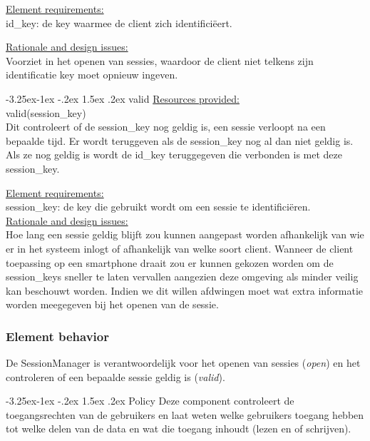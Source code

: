 \documentclass[a4paper,10pt]{book}
\makeatletter
\renewcommand\paragraph{\@startsection{paragraph}{4}{\z@}%
  {-3.25ex\@plus -1ex \@minus -.2ex}%
  {1.5ex \@plus .2ex}%
  {\normalfont\normalsize\bfseries}}
\makeatother
\begin{document}
\underline{Element requirements:}\\
id\_key: de key waarmee de client zich identifici\"{e}ert.

\underline{Rationale and design issues:}\\
Voorziet in het openen van sessies, waardoor de client niet telkens zijn identificatie key moet opnieuw ingeven.

\paragraph{valid}
\underline{Resources provided:}\\
valid(session\_key)\\
Dit controleert of de session\_key nog geldig is, een sessie verloopt na een bepaalde tijd.  Er wordt teruggeven als de session\_key nog al dan niet geldig is.  Als ze nog geldig is wordt de id\_key teruggegeven die verbonden is met deze session\_key.

\underline{Element requirements:}\\
session\_key: de key die gebruikt wordt om een sessie te identifici\"{e}ren.\\

\underline{Rationale and design issues:}\\
Hoe lang een sessie geldig blijft zou kunnen aangepast worden afhankelijk van wie er in het systeem inlogt of afhankelijk van welke soort client.  Wanneer de client toepassing op een smartphone draait zou er kunnen gekozen worden om de session\_keys sneller te laten vervallen aangezien deze omgeving als minder veilig kan beschouwt worden.  Indien we dit willen afdwingen moet wat extra informatie worden meegegeven bij het openen van de sessie.

\subsubsection{Element behavior}
De SessionManager is verantwoordelijk voor het openen van sessies (\textit{open}) en het controleren of een bepaalde sessie geldig is (\textit{valid}).

\paragraph{Policy}
Deze component controleert de toegangsrechten van de gebruikers en laat weten welke gebruikers toegang hebben tot welke delen van de data en wat die toegang inhoudt (lezen en of schrijven).
\end{document}
